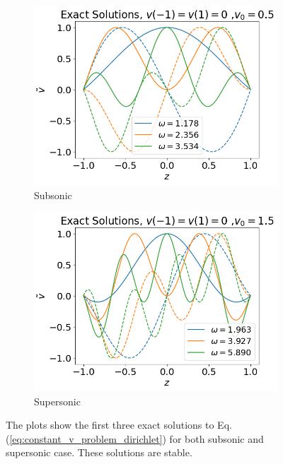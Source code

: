 \begin{figure}[H]
	\centering
	\begin{subfigure}{0.5\textwidth}
		\includegraphics[width=\linewidth]{img/theoretical_analysis/exact_v0=0.5}
		\caption{Subsonic}
	\end{subfigure}%
	\begin{subfigure}{0.5\textwidth}
		\includegraphics[width=\linewidth]{img/theoretical_analysis/exact_v0=1.5}
		\caption{Supersonic}
	\end{subfigure}
	\caption{The plots show the first three exact solutions to Eq.(\ref{eq:constant_v_problem_dirichlet}) for both subsonic and supersonic case. These solutions are stable.}
	\label{fig:exact_v}
\end{figure}

